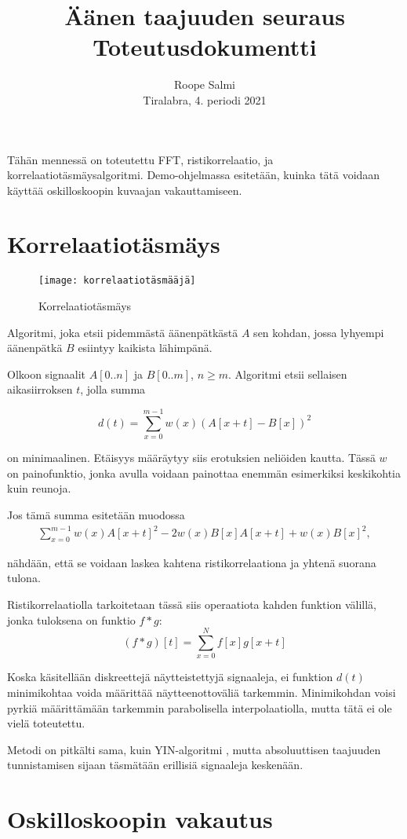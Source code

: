 \documentclass[11pt,oneside,a4paper]{memoir}
\title{Äänen taajuuden seuraus\\ Toteutusdokumentti}
\author{Roope Salmi\\ Tiralabra, 4. periodi 2021}
\date{}
\begin{document}
\maketitle

Tähän mennessä on toteutettu FFT, ristikorrelaatio, ja korrelaatiotäsmäysalgoritmi.
Demo-ohjelmassa esitetään, kuinka tätä voidaan käyttää oskilloskoopin kuvaajan vakauttamiseen.

\section*{Korrelaatiotäsmäys}
\begin{figure}
\centering
\texttt{[image: korrelaatiotäsmääjä]}
\caption{Korrelaatiotäsmäys}
\label{fig:korrelaatio}
\end{figure}

Algoritmi, joka etsii pidemmästä äänenpätkästä $A$ sen kohdan, jossa
lyhyempi äänenpätkä $B$ esiintyy kaikista lähimpänä.

Olkoon signaalit $A[0..n]$ ja $B[0..m]$, $n \ge m$.
Algoritmi etsii sellaisen aikasiirroksen $t$, jolla summa

\[
d(t) = \sum_{x=0}^{m-1} w(x) (A[x+t] - B[x])^2
\]

on minimaalinen. Etäisyys määräytyy siis erotuksien neliöiden kautta.
Tässä $w$ on painofunktio, jonka avulla voidaan painottaa enemmän esimerkiksi
keskikohtia kuin reunoja.

\clearpage
Jos tämä summa esitetään muodossa
\begin{align*}
\sum_{x=0}^{m-1} w(x) A[x+t]^2 - 2w(x) B[x] A[x+t] + w(x) B[x]^2,
\end{align*}

nähdään, että se voidaan laskea kahtena ristikorrelaationa ja yhtenä suorana tulona.

Ristikorrelaatiolla tarkoitetaan tässä siis operaatiota kahden funktion välillä, jonka
tuloksena on funktio $f * g$:
\[
(f * g)[t] = \sum_{x=0}^{N} f[x] g[x+t]
\]

Koska käsitellään diskreettejä näytteistettyjä signaaleja, ei funktion $d(t)$
minimikohtaa voida määrittää näytteenottoväliä tarkemmin.
Minimikohdan voisi pyrkiä määrittämään tarkemmin parabolisella interpolaatiolla,
mutta tätä ei ole vielä toteutettu.

Metodi on pitkälti sama, kuin YIN-algoritmi \cite{yin}, mutta absoluuttisen taajuuden tunnistamisen
sijaan täsmätään erillisiä signaaleja keskenään.

\section*{Oskilloskoopin vakautus}
\end{document}
